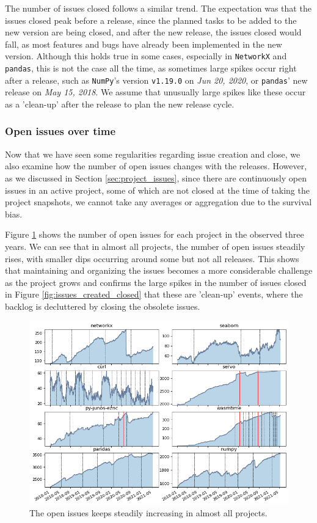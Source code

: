The number of issues closed follows a similar trend. The expectation was that the issues closed peak before a release, since the planned tasks to be added to the new version are being closed, and after the new release, the issues closed would fall, as most features and bugs have already been implemented in the new version. Although this holds true in some cases, especially in \texttt{NetworkX} and \texttt{pandas}, this is not the case all the time, as sometimes large spikes occur right after a release, such as \texttt{NumPy}'s version \texttt{v1.19.0} on \textit{Jun 20, 2020}, or \texttt{pandas}' new release on \textit{May 15, 2018}. We assume that unusually large spikes like these occur as a 'clean-up' after the release to plan the new release cycle.

\subsubsection{Open issues over time}

Now that we have seen some regularities regarding issue creation and close, we also examine how the number of open issues changes with the releases. However, as we discussed in Section \ref{sec:project_issues}, since there are continuously open issues in an active project, some of which are not closed at the time of taking the project snapshots, we cannot take any averages or aggregation due to the survival bias.

Figure \ref{fig:open_issues} shows the number of open issues for each project in the observed three years. We can see that in almost all projects, the number of open issues steadily rises, with smaller dips occurring around some but not all releases. This shows that maintaining and organizing the issues becomes a more considerable challenge as the project grows and confirms the large spikes in the number of issues closed in Figure \ref{fig:issues_created_closed} that these are 'clean-up' events, where the backlog is decluttered by closing the obsolete issues.

\begin{figure}[!htbp]
    \centering
    \includegraphics[width=\textwidth]{figures/qualitative/issues_closed_created/open_issues.png}
    \caption{The open issues keeps steadily increasing in almost all projects.}
    \label{fig:open_issues}
\end{figure}

